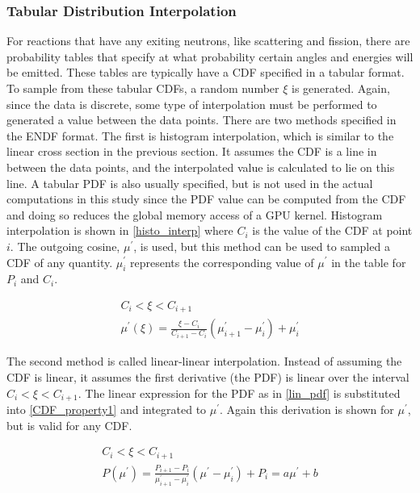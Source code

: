 \subsubsection{Tabular Distribution Interpolation}

For reactions that have any exiting neutrons, like scattering and fission, there are probability tables that specify at what probability certain angles and energies will be emitted.  These tables are typically have a CDF specified in a tabular format.  To sample from these tabular CDFs, a random number $\xi$ is generated.  Again, since the data is discrete, some type of interpolation must be performed to generated a value between the data points.  There are two methods specified in the ENDF format.  The first is histogram interpolation, which is similar to the linear cross section in the previous section.  It assumes the CDF is a line in between the data points, and the interpolated value is calculated to lie on this line.  A tabular PDF is also usually specified, but is not used in the actual computations in this study since the PDF value can be computed from the CDF and doing so reduces the global memory access of a GPU kernel.  Histogram interpolation is shown in \eqref{histo_interp} where $C_{i}$ is the value of the CDF at point $i$.  The outgoing cosine, $\mu^\prime$, is used, but this method can be used to sampled a CDF of any quantity.  $\mu^\prime_i$ represents the corresponding value of $\mu^\prime$ in the table for $P_i$ and $C_i$.

 \begin{equation}
\label{histo_interp}
\begin{gathered}
C_i < \xi < C_{i+1} \\
 \mu^\prime(\xi) = \frac{\xi-C_i}{C_{i+1}-C_i}(\mu^\prime_{i+1}-\mu^\prime_i) + \mu^\prime_i
\end{gathered}
\end{equation}

The second method is called linear-linear interpolation.  Instead of assuming the CDF is linear, it assumes the first derivative (the PDF) is linear over the interval $C_i < \xi < C_{i+1}$.  The linear expression for the PDF as in \eqref{lin_pdf} is substituted into \eqref{CDF_property1} and integrated to $\mu^\prime$.  Again this derivation is shown for $\mu^\prime$, but is valid for any CDF.

\begin{equation}
\label{lin_pdf}
\begin{gathered}
C_i < \xi < C_{i+1} \\
P(\mu^\prime) = \frac{P_{i+1}-P_i}{\mu^\prime_{i+1}-\mu^\prime_i}(\mu^\prime - \mu^\prime_i) + P_i = a \mu^\prime + b
\end{gathered}
\end{equation}

